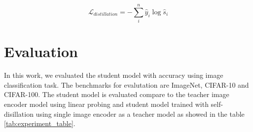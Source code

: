 \begin{equation}
    \label{eq:loss_self_dist}
    \mathcal{L}_{distillation} = -\sum_{i}^{n} \hat{y}_i\log\hat{s}_i
\end{equation}



\section{Evaluation}
In this work, we evaluated the student model with accuracy using image classification task.
The benchmarks for evalutation are ImageNet, CIFAR-10 and CIFAR-100.
The student model is evaluated compare to the teacher image encoder model using linear probing and student model trained with self-disillation using single image encoder as a teacher model as showed in the table \ref{tab:experiment_table}.

